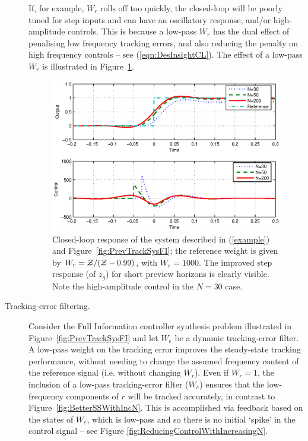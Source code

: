 \begin{description}
If, for example, $W_r$ rolls off too quickly, the closed-loop will be poorly tuned for step inputs and can have an oscillatory response, and/or high-amplitude controls. This is because a low-pass $W_r$ has the dual effect of penalising low frequency tracking errors, and also reducing the penalty on high frequency controls -- see (\ref{eqn:DesInsightCL}).
The effect of a low-pass $W_r$ is illustrated in Figure~\ref{fig:WrWithIncreasingPreview}.
\begin{figure}
\includegraphics[width=\columnwidth]{./diags/WrWithIncreasingPreview.eps}
\caption{Closed-loop response of the system described in (\ref{example}) and Figure~\ref{fig:PrevTrackSysFI}; the reference weight is given by $W_r=\mathcal{Z}/(\mathcal{Z}-0.99)$, with $W_e=1000$. The improved step response (of $z_g$) for short preview horizons is clearly visible. Note the high-amplitude control in the $N=30$ case. \label{fig:WrWithIncreasingPreview}}
\end{figure}
\item[Tracking-error filtering.]
Consider the Full Information controller synthesis problem illustrated in Figure~\ref{fig:PrevTrackSysFI} and let $W_e$ be a dynamic
tracking-error filter. A low-pass weight on the tracking error improves the steady-state tracking performance, without needing to change the assumed frequency content of the reference signal (i.e. without changing $W_r$). Even if $W_r=1$,  the inclusion of a low-pass tracking-error filter ($W_e$) ensures that the low-frequency components of $r$ will be tracked accurately, in contrast to Figure~\ref{fig:BetterSSWithIncN}. This is accomplished via feedback based on the states of $W_e$, which is low-pass and so there is no initial `spike' in the control signal -- see Figure \ref{fig:ReducingControlWithIncreasingN}. 

\end{description}
